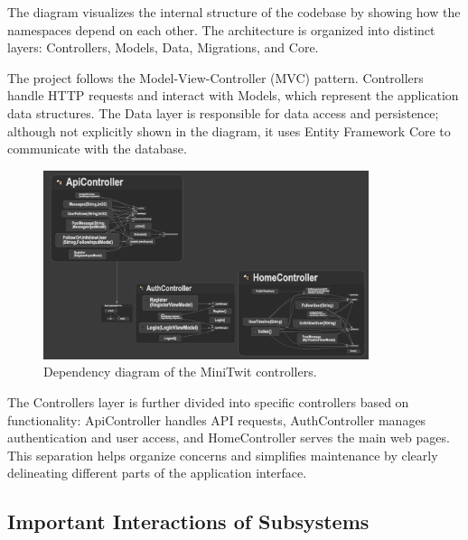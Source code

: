 \documentclass[12pt,a4paper,reqno]{report}
\begin{document}
The diagram visualizes the internal structure of the codebase by showing how the namespaces depend on each other. The architecture is organized into distinct layers: Controllers, Models, Data, Migrations, and Core.

The project follows the Model-View-Controller (MVC) pattern. Controllers handle HTTP requests and interact with Models, which represent the application data structures. The Data layer is responsible for data access and persistence; although not explicitly shown in the diagram, it uses Entity Framework Core to communicate with the database.

\vspace*{0.5cm}

\begin{figure}[h!]
    \centering
    \includegraphics[width=0.85\textwidth]{images/MiniTwitControllers-DependencyDiagram.png}
    \caption{Dependency diagram of the MiniTwit controllers.}
    \label{fig:minitwit-diagram}
\end{figure}

The Controllers layer is further divided into specific controllers based on functionality: ApiController handles API requests, AuthController manages authentication and user access, and HomeController serves the main web pages. This separation helps organize concerns and simplifies maintenance by clearly delineating different parts of the application interface.

\subsection{Important Interactions of Subsystems}

\end{document}
